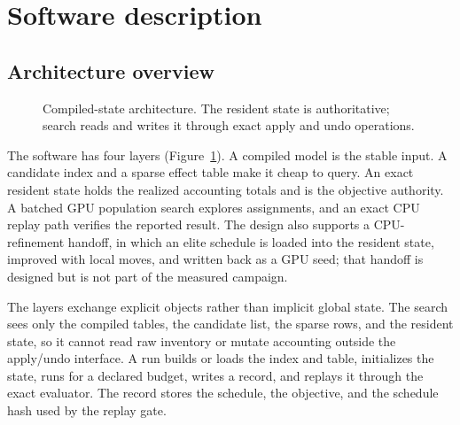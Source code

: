 \documentclass[a4paper,fleqn]{cas-sc}
\begin{document}
\section{Software description}

\subsection{Architecture overview}

\begin{figure}[t]
\centering
{}
\caption{Compiled-state architecture. The resident state is authoritative; search reads and writes it
through exact apply and undo operations.}
\label{fig:architecture}
\end{figure}

The software has four layers (Figure~\ref{fig:architecture}). A compiled model is the stable input. A
candidate index and a sparse effect table make it cheap to query. An exact resident state holds the
realized accounting totals and is the objective authority. A batched GPU population search explores
assignments, and an exact CPU replay path verifies the reported result. The design also supports a
CPU-refinement handoff, in which an elite schedule is loaded into the resident state, improved with
local moves, and written back as a GPU seed; that handoff is designed but is not part of the measured
campaign.

The layers exchange explicit objects rather than implicit global state. The search sees only the
compiled tables, the candidate list, the sparse rows, and the resident state, so it cannot read raw
inventory or mutate accounting outside the apply/undo interface. A run builds or loads the index and
table, initializes the state, runs for a declared budget, writes a record, and replays it through the
exact evaluator. The record stores the schedule, the objective, and the schedule hash used by the
replay gate.
\end{document}
